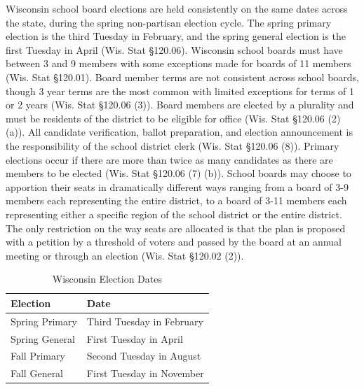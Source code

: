 Wisconsin school board elections are held consistently on the same dates across 
the state, during the spring non-partisan election cycle. The spring primary election is the 
third Tuesday in February, and the spring general election is the first Tuesday 
in April (Wis. Stat \S 120.06). Wisconsin school boards must have between 3 and 9 
members with some exceptions made for boards of 11 members (Wis. Stat \S 120.01). 
Board member terms are not consistent across school boards, though 3 year terms are 
the most common with limited exceptions for terms of 1 or 2 years (Wis. Stat \S 120.06 (3)). 
Board members are elected by a plurality and must be residents of the district to 
be eligible for office (Wis. Stat \S 120.06 (2) (a)). All candidate verification, 
ballot preparation, and election announcement is the responsibility of the school district 
clerk (Wis. Stat \S 120.06 (8)). Primary elections occur if there are more than 
twice as many candidates as there are members to be elected (Wis. Stat \S 120.06 (7) (b)). 
School boards may choose to apportion their seats in dramatically different ways 
ranging from a board of 3-9 members each representing the entire district, to a board 
of 3-11 members each representing either a specific region of the school district or 
the entire district. The only restriction on the way seats are allocated is that the 
plan is proposed with a petition by a threshold of voters and passed by the board 
at an annual meeting or through an election (Wis. Stat \S 120.02 (2)). 


\begin{table}[h!]
\begin{center}
\caption{Wisconsin Election Dates}
\label{tab:elecdates}
\begin{tabular}{| p{} | p{} |}
\hline
\textbf{Election}  & \textbf{Date}  \\ \hline
Spring Primary  & Third Tuesday in February  \\ \hline
Spring General &  First Tuesday in April  \\ \hline
Fall Primary & Second Tuesday in August \\ \hline
Fall General & First Tuesday in November\\ \hline
\end{tabular}
\end{center}
\end{table}

